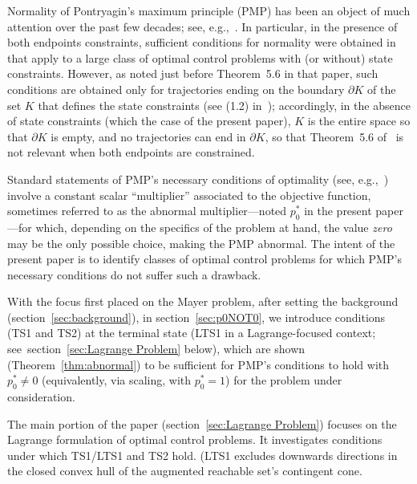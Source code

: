 \documentclass[letterpaper,10pt,conference]{ieeeconf}
\begin{document}
Normality of Pontryagin's maximum principle (PMP) has 
been an object of much attention over the past 
few decades; see, e.g.,~\cite{FrankowskaTonon2013, BettiolFrankowska2007,
RampazzoVinter1999, BettiolKhalil2016, FerreiraFontesVinter1999}.
In particular, in the presence of both endpoints constraints, sufficient 
conditions
for normality were obtained in~\cite{FrankowskaTonon2013} that apply
to a large class of optimal control problems with (or without) state 
constraints.  However, as noted just before Theorem~5.6 in that paper,
such conditions are obtained only for trajectories ending on the boundary
$\partial K$ of the set $K$ that defines the state constraints (see (1.2)
in~\cite{FrankowskaTonon2013}); accordingly, in the absence of state
constraints (which the case of the present paper), $K$ is the 
entire space so that $\partial K$ is empty, and no trajectories can end 
in $\partial K$, so that Theorem~5.6 
of~\cite{FrankowskaTonon2013} is not relevant when both endpoints
are constrained.

Standard statements of PMP's necessary
conditions of optimality %
(see, e.g.,~\cite{Varaiya72:0, Vinter2000, Liberzon2012}) 
involve a 
constant scalar ``multiplier'' associated to the objective function, 
sometimes
referred to as the abnormal multiplier---noted $p_0^*$ in 
the present paper---for which, depending on the specifics of the problem at 
hand, the value {\em zero}
may be the only possible choice, making the 
PMP abnormal.
The intent of the present paper is to identify classes of optimal
control problems for which PMP's necessary conditions do not 
suffer such a drawback.

With the focus first placed on the Mayer problem,
after setting the background
(section~\ref{sec:background}), in section~\ref{sec:p0NOT0},
we introduce conditions (TS1 and TS2) at the terminal state
(LTS1 in a Lagrange-focused context; see~section~\ref{sec:Lagrange Problem} 
below), which are shown
(Theorem~\ref{thm:abnormal}) to be sufficient for PMP's 
conditions to hold with $p_0^*\not=0$ (equivalently, via scaling,
with $p_0^*=1$) 
for the problem under consideration.

The main portion of the paper (section~\ref{sec:Lagrange Problem}) focuses 
on the Lagrange formulation of optimal control problems.  
It investigates conditions under which TS1/LTS1 and TS2 hold.
(LTS1 excludes downwards directions in the closed convex hull of the 
augmented reachable set's contingent cone.
% 
\end{document}
